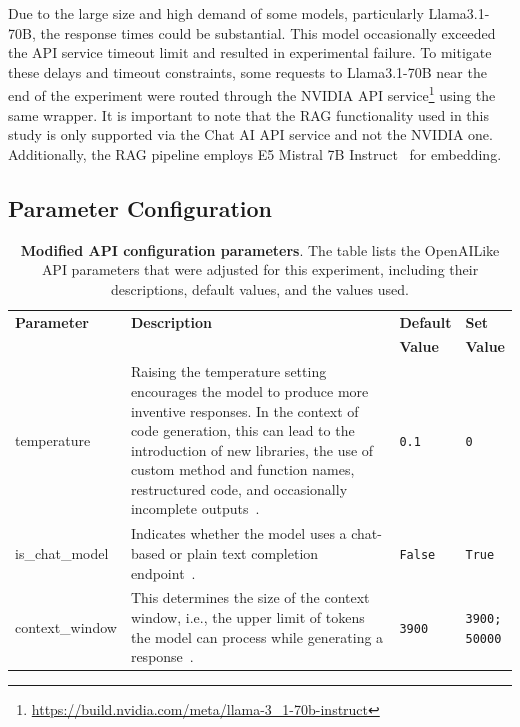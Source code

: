 \documentclass{DESSThesis}
\begin{document}
Due to the large size and high demand of some models, particularly Llama3.1-70B, the response times could be substantial. This model occasionally exceeded the API service timeout limit and resulted in experimental failure. To mitigate these delays and timeout constraints, some requests to Llama3.1-70B near the end of the experiment were routed through the NVIDIA API service\footnote{\url{https://build.nvidia.com/meta/llama-3_1-70b-instruct}} using the same wrapper. It is important to note that the RAG functionality used in this study is only supported via the Chat AI API service and not the NVIDIA one. Additionally, the RAG pipeline employs E5 Mistral 7B Instruct~\cite{wang2024improvingtextembeddingslarge} for embedding.

\subsection{Parameter Configuration}

\begin{table}[ht]
\centering
\small
\begin{tabular}{l p{8cm} l p{1.1cm}}
\toprule
\textbf{Parameter} & \textbf{Description} & \textbf{Default} & \textbf{Set} \\ & & \textbf{Value} & \textbf{Value} \\
\midrule
temperature & Raising the temperature setting encourages the model to produce more inventive responses. In the context of code generation, this can lead to the introduction of new libraries, the use of custom method and function names, restructured code, and occasionally incomplete outputs~\cite{deshpande2025retrieval}. & \texttt{0.1} & \texttt{0} \\
\midrule
is\_chat\_model & Indicates whether the model uses a chat-based or plain text completion endpoint~\cite{openai_like}. & \texttt{False} & \texttt{True} \\
\midrule
context\_window & This determines the size of the context window, i.e., the upper limit of tokens the model can process while generating a response~\cite{openai_like}. & \texttt{3900} & \texttt{3900; \newline 50000} \\
\bottomrule
\end{tabular}
\caption[Modified API configuration parameters]{\textbf{Modified API configuration parameters}. The table lists the OpenAILike API parameters that were adjusted for this experiment, including their descriptions, default values, and the values used.}
\label{tab:api_config_params}
\end{table}
\end{document}

